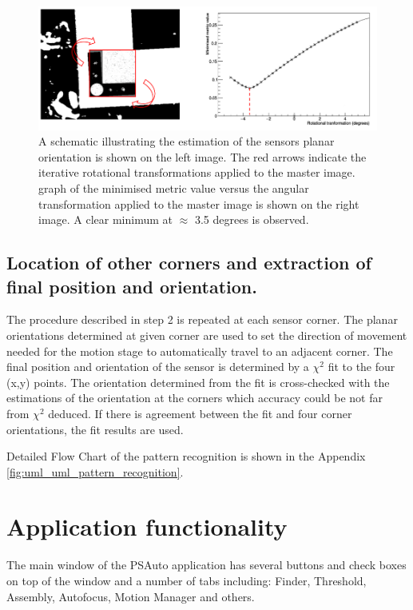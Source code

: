 \begin{figure}[ht]\centering
\includegraphics[width=0.9\linewidth]{Data/Control_Software/Template_rotation.png}
\caption{A schematic illustrating the estimation of the sensors planar orientation is shown on the left image. The red arrows indicate the iterative rotational transformations applied to the master image. graph of the minimised metric value versus the angular transformation applied to the master image is shown on the right image. A clear minimum at $\approx$ 3.5 degrees is observed.}
\label{fig:template_rotation}
\end{figure}

\subsection{Location of other corners and extraction of final position and orientation.}
The procedure described in step 2 is repeated at each sensor corner. The planar orientations determined at given corner are used to set the direction of movement needed for the motion stage to automatically travel to an adjacent corner. The final position and orientation of the sensor is determined by a $\chi^{2}$ fit to the four (x,y) points. The orientation determined from the fit is cross-checked with the estimations of the orientation at the corners which accuracy could be not far from $\chi^{2}$ deduced. If there is agreement between the fit and four corner orientations, the fit results are used.

Detailed Flow Chart of the pattern recognition is shown in the Appendix \ref{fig:uml_uml_pattern_recognition}.

\section{Application functionality}

The main window of the PSAuto application has several buttons and check boxes on top of the window and a number of tabs including: Finder, Threshold, Assembly, Autofocus, Motion Manager and others.

